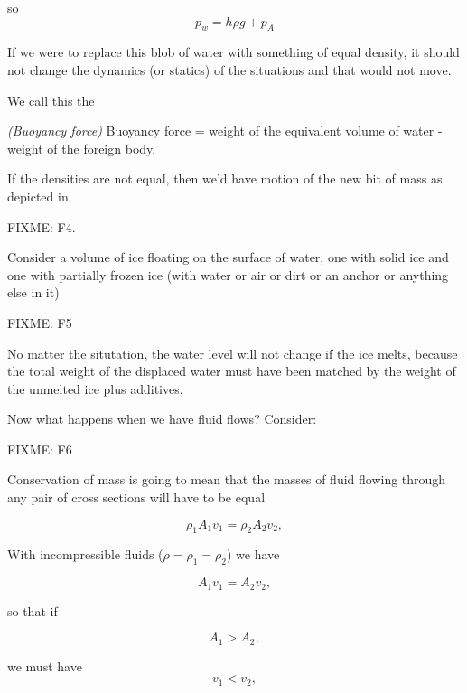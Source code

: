 so
\begin{equation}\label{eqn:continuumL13:n}
p_w = h \rho g + p_A
\end{equation}

If we were to replace this blob of water with something of equal density, it should not change the dynamics (or statics) of the situations and that would not move.

We call this the

\begin{definition}
\emph{(Buoyancy force)}
\label{dfn:continuumL13:n}
Buoyancy force = 
weight of the equivalent volume of water - weight of the foreign body.
\end{definition}

If the densities are not equal, then we'd have motion of the new bit of mass as depicted in

FIXME: F4.

Consider a volume of ice floating on the surface of water, one with solid ice and one with partially frozen ice (with water or air or dirt or an anchor or anything else in it)

FIXME: F5

No matter the situtation, the water level will not change if the ice melts, because the total weight of the displaced water must have been matched by the weight of the unmelted ice plus additives.

Now what happens when we have fluid flows?  Consider:

FIXME: F6

Conservation of mass is going to mean that the masses of fluid flowing through any pair of cross sections will have to be equal

\begin{equation}\label{eqn:continuumL13:n}
\rho_1 A_1 v_1 = \rho_2 A_2 v_2,
\end{equation}

With incompressible fluids ($\rho = \rho_1 = \rho_2$) we have

\begin{equation}\label{eqn:continuumL13:n}
A_1 v_1 = A_2 v_2,
\end{equation}

so that if 

\begin{equation}\label{eqn:continuumL13:n}
A_1 > A_2,
\end{equation}

we must have
\begin{equation}\label{eqn:continuumL13:n}
v_1 < v_2,
\end{equation}

